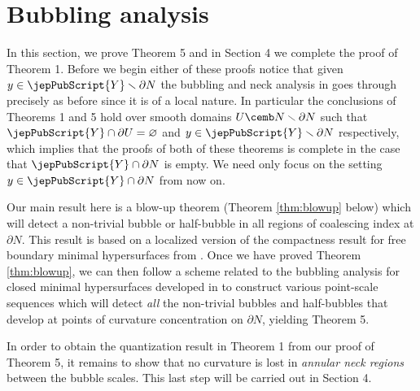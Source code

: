 \section{Bubbling analysis}\label{sec:bubbling}
        	 	
        	 	
        	 	In this section, we prove Theorem 5 and in Section 4 we complete the proof of Theorem 1. Before we begin either of these proofs notice that given $y\in {\jepPubScript{Y}}\smallsetminus \partial N$ the bubbling and neck analysis in \cite{BS17} goes through precisely as before since it is of a local nature. In particular the conclusions of Theorems 1 and 5 hold over smooth domains $U\cemb N\smallsetminus\partial N$ such that ${\jepPubScript{Y}}\cap \partial U =\varnothing$ and $y\in {\jepPubScript{Y}}\smallsetminus \partial N$ respectively, which implies that the proofs of both of these theorems is complete in the case that ${\jepPubScript{Y}}\cap \partial N$ is empty. We need only focus on the setting $y\in {\jepPubScript{Y}}\cap \partial N$ from now on. 
        	 	
        	 	Our main result here is a blow-up theorem (Theorem \ref{thm:blowup} below) which will detect a non-trivial bubble or half-bubble in all regions of coalescing index at $\partial N$. 
        	 	This result is based on a localized version of the compactness result for free boundary minimal hypersurfaces from \cite{ACS17}. Once we have proved Theorem \ref{thm:blowup}, we can then follow a scheme related to the bubbling analysis for closed minimal hypersurfaces developed in \cite[\S3]{BS17} to construct various point-scale sequences which will detect \emph{all} the non-trivial bubbles and half-bubbles that develop at points of curvature concentration on $\partial N$, yielding Theorem 5. 
        	 	
        	 	In order to obtain the quantization result in Theorem 1 from our proof of Theorem 5, it remains to show that no curvature is lost in \emph{annular neck regions} between the bubble scales. This last step will be carried out in Section 4.\\
        	 	
        	 	
        	 	
